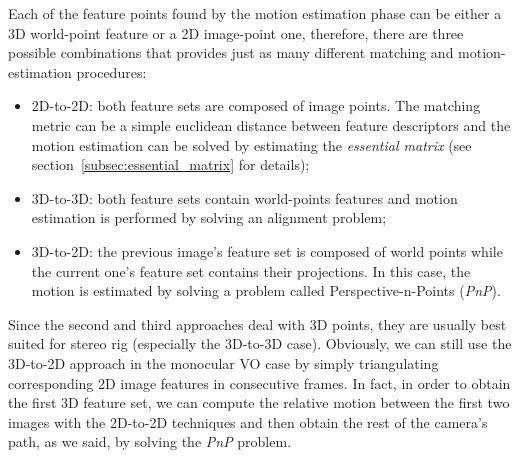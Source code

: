 Each of the feature points found by the motion estimation phase can be 
either a 3D world-point feature or a 2D image-point one,
therefore, there are three possible combinations that provides just as many 
different matching and motion-estimation procedures:
\begin{itemize}
	\item 2D-to-2D: both feature sets are composed of image points.
The matching metric can be a simple euclidean distance between feature 
descriptors and the motion estimation can be solved by estimating the 
\textit{essential matrix} (see section~\ref{subsec:essential_matrix} for 
details);
	\item 3D-to-3D: both feature sets contain world-points features and motion
estimation is performed by solving an alignment problem;
	\item 3D-to-2D: the previous image's feature set is composed of world points while
the current one's feature set contains their projections. In this case, the motion 
is estimated by solving a problem called Perspective-n-Points (\textit{PnP}).
\end{itemize}
Since the second and third approaches deal with 3D points, they are usually 
best suited for stereo rig (especially the 3D-to-3D case).
Obviously, we can still use the 3D-to-2D approach in the monocular VO case by simply 
triangulating corresponding 2D image features in consecutive frames.
In fact, in order to obtain the first 3D feature set,
we can compute the relative motion between the first two images with 
the 2D-to-2D techniques and then obtain the rest of the camera's path,
as we said, by solving the \textit{PnP} problem.
%
